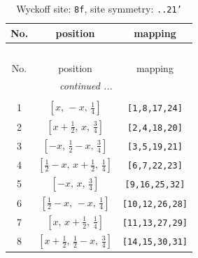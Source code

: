 \documentclass[fleqn,8pt]{jsarticle}
\begin{document}
\begin{longtable}{ccc}
\caption{Wyckoff site: {\tt 8f}, site symmetry: {\tt ..21'}}
 \\
 \hline \hline
No. & position & mapping \\ \hline \endfirsthead

\multicolumn{2}{l}{\tablename\ \thetable{}} \\
 \hline \hline
No. & position & mapping \\ \hline \endhead

 \hline \hline
\multicolumn{2}{r}{\footnotesize\it continued ...} \\ \endfoot

 \hline \hline
\multicolumn{2}{r}{} \\ \endlastfoot

1 & $\left[ x,\, - x,\, \frac{1}{4} \right]$ & {\tt [1,8,17,24]} \\ \hline
2 & $\left[ x + \frac{1}{2},\, x,\, \frac{3}{4} \right]$ & {\tt [2,4,18,20]} \\ \hline
3 & $\left[ - x,\, \frac{1}{2} - x,\, \frac{3}{4} \right]$ & {\tt [3,5,19,21]} \\ \hline
4 & $\left[ \frac{1}{2} - x,\, x + \frac{1}{2},\, \frac{1}{4} \right]$ & {\tt [6,7,22,23]} \\ \hline
5 & $\left[ - x,\, x,\, \frac{3}{4} \right]$ & {\tt [9,16,25,32]} \\ \hline
6 & $\left[ \frac{1}{2} - x,\, - x,\, \frac{1}{4} \right]$ & {\tt [10,12,26,28]} \\ \hline
7 & $\left[ x,\, x + \frac{1}{2},\, \frac{1}{4} \right]$ & {\tt [11,13,27,29]} \\ \hline
8 & $\left[ x + \frac{1}{2},\, \frac{1}{2} - x,\, \frac{3}{4} \right]$ & {\tt [14,15,30,31]} \\
\end{longtable}
\renewcommand{\arraystretch}{1.2}
\end{document}
